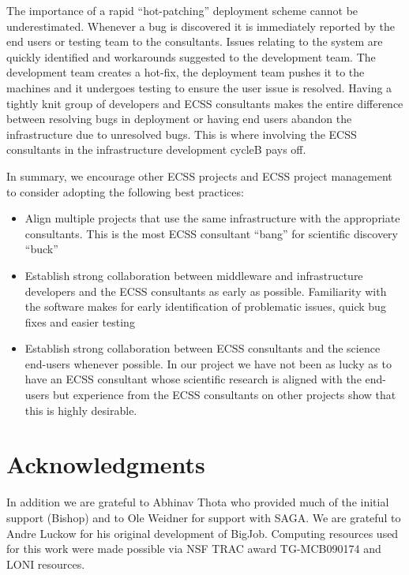 \documentclass{sig-alternate}
\begin{document}
The importance of a rapid ``hot-patching'' deployment scheme cannot be
underestimated. Whenever a bug is discovered it is immediately
reported by the end users or testing team to the consultants. Issues
relating to the system are quickly identified and workarounds
suggested to the development team. The development team creates a
hot-fix, the deployment team pushes it to the machines and it
undergoes testing to ensure the user issue is resolved. Having a
tightly knit group of developers and ECSS consultants makes the entire
difference between resolving bugs in deployment or having end users
abandon the infrastructure due to unresolved bugs. This is where
involving the ECSS consultants in the infrastructure development cycleB
pays off.

In summary, we encourage other ECSS projects and ECSS project
management to consider adopting the following best practices:
\begin{itemize}
 \item Align multiple projects that use the same infrastructure
 with the appropriate consultants. This is the most ECSS consultant
 ``bang'' for scientific discovery ``buck''
 \item Establish strong collaboration between middleware and infrastructure
 developers and the ECSS consultants as early as possible. Familiarity with the software makes for early
 identification of problematic issues, quick bug fixes and easier testing
 \item Establish strong collaboration between ECSS consultants and the science
 end-users whenever possible. In our project we have not been as lucky as to
 have an ECSS consultant whose scientific research is aligned with the end-users
 but experience from the ECSS consultants on other projects show that this is highly
 desirable.
\end{itemize}



\section{Acknowledgments}
In addition we are grateful to Abhinav Thota who provided much of the
initial support (Bishop) and to Ole Weidner for support with SAGA. We
are grateful to Andre Luckow for his original development of BigJob.
Computing resources used for this work were made possible via NSF TRAC
award TG-MCB090174 and LONI resources.  



\end{document}
